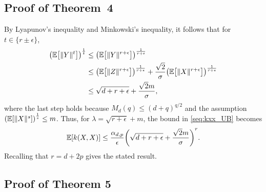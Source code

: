 \documentclass{article}
\theoremstyle{definition}
\newcommand{\ex}[1]{\ensuremath{\mathbb{E}\left[ #1\right]}}
\newcommand{\eps}{\epsilon}
\let\originalleft\left
\let\originalright\right
\renewcommand{\left}{\mathopen{}\mathclose\bgroup\originalleft}
\renewcommand{\right}{\aftergroup\egroup\originalright}
\begin{document}
\subsection{Proof of Theorem~4} 
By Lyapunov's inequality  and Minkowski's inequality, it follows that for  $t \in \{ r \pm \eps\}$, 
\begin{align*}
\left( \ex{ \|Y\|^t} \right)^\frac{1}{t}
& \le  \left( \ex{ \|Y\|^{r+\eps} } \right)^\frac{1}{r+\eps} \\
&  \le 
   \left( \ex{\|Z\|^{r+\eps}} \right)^\frac{1}{r + \eps}  +   \frac{\sqrt{2}}{\sigma}  \left( \ex{\|X\|^{r+\eps}} \right)^\frac{1}{r + \eps}   \\
  & \le \sqrt{d +  r + \eps}  + \frac{ \sqrt{2} m }{\sigma} , %
\end{align*}
where the last step holds because $M_d(q) \le (d + q)^{q/2}$ and the assumption $\left(\ex{ \|X\|^s}\right)^{\frac{1}{s}} \le m$.  Thus, for $\lambda =  \sqrt{ r + \eps}  + m $, the bound in \eqref{seq:kxx_UB} becomes
\begin{align*}
\ex{ k(X,X) } \le  \frac{ \alpha_{d,p}  }{ \eps} \left( \sqrt{d  + r + \eps}  + \frac{ \sqrt{2} m }{\sigma}   \right)^{r}.
\end{align*}
Recalling that $r = d + 2p$ gives the stated result.


\subsection{Proof of Theorem 5} 
\end{document}
